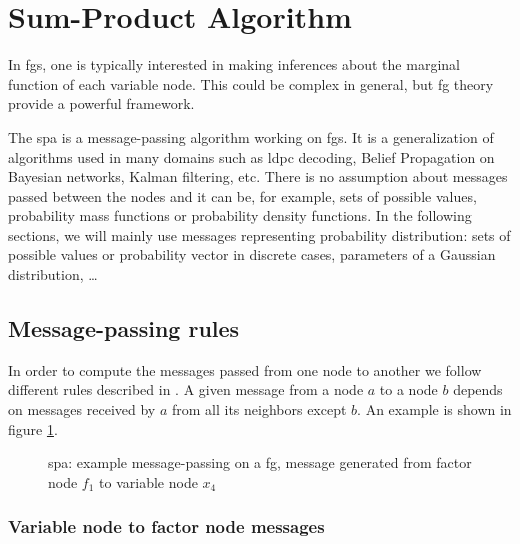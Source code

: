 \documentclass[a4paper,11pt]{report}
\newlength\gheight
\newlength\ndist
\newlength\fghskip
\newcommand{\fgargset}[1]{\pgfkeys{/factorgraph/.cd,#1}}
\newcommand{\factorgraph}[1][]{
    \begin{scope}
        \fgargset{#1}
        \pgfmathsetlength\gheight{\fgheight}
        \pgfmathsetlength\fghskip{0}
        \ifnum\fgnbv>1
            \pgfmathsetlength\ndist{\gheight/(\fgnbv-1)}
        \else
            \pgfmathsetlength\ndist{0}
            \ifnum\fgnbf>1
                \pgfmathsetlength\fghskip{-\gheight/2}
            \fi
        \fi
        \begin{scope}[shift={(0,\fghskip)},start chain=1 going {at=(\tikzchainprevious),shift=(-90:\ndist)}]
            \foreach \i in {1,...,\fgnbv} {
                    \node[on chain=1, ellipse, draw] (x_\i) {\fgvlabel};
            }
        \end{scope}
        \pgfmathsetlength\fghskip{0}
        \ifnum\fgnbf>1
            \pgfmathsetlength\ndist{\gheight/(\fgnbf-1)}
        \else
            \ifnum\fgnbv>1
                \pgfmathsetlength\fghskip{-\gheight/2}
            \fi
            \pgfmathsetlength\ndist{0}
        \fi
        \begin{scope}[shift={(\fgwidth,\fghskip)}, start chain=2 going {at=(\tikzchainprevious),shift=(-90:\ndist)}]
            \foreach \j in {1,...,\fgnbf} {
                \node[on chain=2, rectangle, draw] (f_\j) {\fgflabel};
            }
        \end{scope}
        \foreach \i/\j/\k in \fgedges {
            \ifnum\pdfstrcmp{\k}{vfm}=0
                \path (x_\i) -- node[sloped] (m_\i_\j) {$m_{\text{\fgvlabel} \to \text{\fgflabel}}$} (f_\j);
                \draw[-latex] (x_\i) -- (m_\i_\j) -- (f_\j);
            \else
                \ifnum\pdfstrcmp{\k}{fvm}=0
                    \path (x_\i) -- node[sloped] (m_\i_\j) {$m_{\text{\fgflabel} \to \text{\fgvlabel}}$} (f_\j);
                    \draw[-latex] (f_\j) -- (m_\i_\j) -- (x_\i);
                \else
                    \draw[-] (x_\i.east) -- (f_\j.west);
                \fi
            \fi
        }
    \end{scope}
}
\begin{document}
\section{Sum-Product Algorithm}

In \acp{fg}, one is typically interested in making inferences about the marginal function of each variable node. This could be complex in general, but \ac{fg} theory provide a powerful framework.

The \ac{spa}\cite{kschischang2001factor} is a message-passing algorithm working on \acp{fg}. It is a generalization of algorithms used in many domains such as \ac{ldpc} decoding, Belief Propagation on Bayesian networks, Kalman filtering, etc. There is no assumption about messages passed between the nodes and it can be, for example, sets of possible values, probability mass functions or probability density functions. In the following sections, we will mainly use messages representing probability distribution: sets of possible values or probability vector in discrete cases, parameters of a Gaussian distribution, …

\subsection{Message-passing rules}
In order to compute the messages passed from one node to another we follow different rules described in \cite{kschischang2001factor}. A given message from a node $a$ to a node $b$ depends on messages received by $a$ from all its neighbors except $b$. An example is shown in figure \ref{fig:spampex}.

\begin{figure}[!ht]
    \centering
    \caption{\ac{spa}: example message-passing on a \ac{fg}, message generated from factor node $f_1$ to variable node $x_4$}
    \label{fig:spampex}
\end{figure}


\subsubsection{Variable node to factor node messages}
\end{document}
